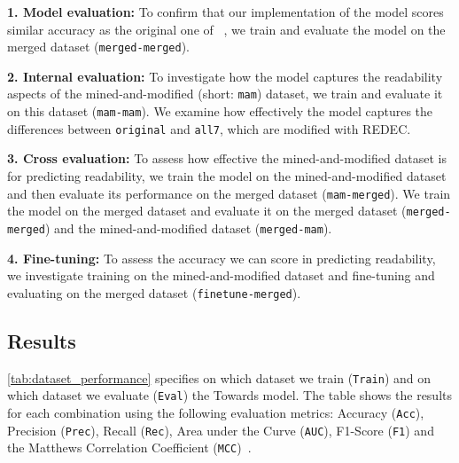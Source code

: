 \documentclass[%
class=scrreprt,
chapterprefix=false,%
open=right,%
twoside=true,%
paper=a4,%
logofile={Logo\_zentral\_farbig\_EN.png},%
thesistype=master,%
UKenglish,%
]{se2thesis}
\theoremstyle{definition}
\newcommand{\rdh}{REDEC\xspace}
\begin{document}
	\textbf{1. Model evaluation:}
	To confirm that our implementation of the model scores similar accuracy as the original one of \citeauthor{mi2022towards}~\cite{mi2022towards}, we train and evaluate the model on the merged dataset (\texttt{merged-merged}).
	
	\textbf{2. Internal evaluation:} 
    To investigate how the model captures the readability aspects of the mined-and-modified (short: \texttt{mam}) dataset, we train and evaluate it on this dataset (\texttt{mam-mam}). We examine how effectively the model captures the differences between \texttt{original} and \texttt{all7}, which are modified with \rdh.
    
    \textbf{3. Cross evaluation:} 
    To assess how effective the mined-and-modified dataset is for predicting readability, we train the model on the mined-and-modified dataset and then evaluate its performance on the merged dataset (\texttt{mam-merged}). We train the model on the merged dataset and evaluate it on the merged dataset (\texttt{merged-merged}) and the mined-and-modified dataset (\texttt{merged-mam}).
    
    \textbf{4. Fine-tuning:} 
    To assess the accuracy we can score in predicting readability, we investigate training on the mined-and-modified dataset and fine-tuning and evaluating on the merged dataset (\texttt{finetune-merged}).
	
\subsection{Results}		
	\autoref{tab:dataset_performance} specifies on which dataset we train (\texttt{Train}) and on which dataset we evaluate (\texttt{Eval}) the Towards model. The table shows the results for each combination using the following evaluation metrics: Accuracy (\texttt{Acc}), Precision (\texttt{Prec}), Recall (\texttt{Rec}), Area under the Curve (\texttt{AUC}), F1-Score (\texttt{F1}) and the Matthews Correlation Coefficient (\texttt{MCC})~\cite{chicco2020advantages}. 
		
\end{document}
